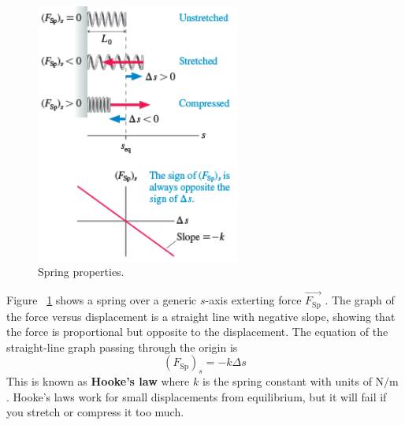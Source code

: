 \begin{figure}
    \centering
    \includegraphics[width=0.6\textwidth]{../figures/spring-properties.png}
    \caption{Spring properties.}%
    \label{fig:spring-properties}
\end{figure}

Figure~%
\ref{fig:spring-properties} shows a spring over a generic
$
    s
$-axis exterting force
$
    \vec{F_\mathrm{Sp}}
$%
.  The graph of the force versus displacement is a straight line with
negative slope, showing that the force is proportional but opposite to
the displacement.  The equation of the straight-line graph passing
through the origin is
\begin{equation}
    (F_\mathrm{Sp})_s = -k\Delta s
\end{equation}
This is known as \textbf{Hooke's law} where
$
    k
$ is the spring constant with units of
$
    \unit{\newton\per\metre}
$%
.  Hooke's laws work for small displacements from equilibrium, but it
will fail if you stretch or compress it too much.

